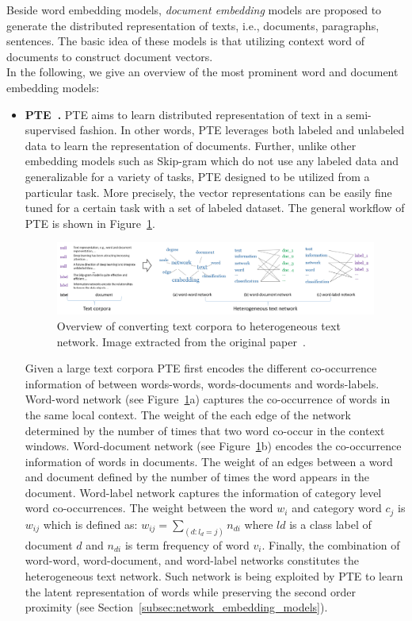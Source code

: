 Beside word embedding models, \textit{document embedding} models are proposed to generate the distributed representation of texts, i.e., documents, paragraphs, sentences. The basic idea of these models is that utilizing context word of documents to construct document vectors. \\
In the following, we give an overview of the most prominent word and document embedding models: \\
\begin{itemize}
\item \textbf{PTE~\cite{PTE}.} PTE aims to learn distributed representation of text in a semi-supervised fashion. In other words, PTE leverages both labeled and unlabeled data to learn the representation of documents. Further, unlike other embedding models such as Skip-gram which do not use any labeled data and generalizable for a variety of tasks, PTE designed to be utilized from a particular task.  More precisely, the vector representations can be easily fine tuned for a certain task with a set of labeled dataset. The general workflow of PTE is shown in Figure~\ref{fig:PTE}.
\begin{figure}[h]
 \includegraphics[width=\linewidth]{Figures/fig_PTE.png}
 \caption{Overview of converting text corpora to heterogeneous text network. Image extracted from the original paper~\cite{PTE}.}
 \label{fig:PTE}
\end{figure} 
Given a large text corpora PTE first encodes the different co-occurrence information of between words-words, words-documents and words-labels. 
Word-word network (see Figure~\ref{fig:PTE}a) captures the co-occurrence of words in the same local context. The weight of the each edge of the network determined by the number of times that two word co-occur in the context windows. Word-document network (see Figure~\ref{fig:PTE}b) encodes the co-occurrence information of words in documents. The weight of an edges between a word and document defined by the number of times the word appears in the document. Word-label network captures the information of category level word co-occurrences. The weight between the word $w_{i}$ and category word $c_{j}$ is $w_{ij}$ which is defined as: $w_{ij} = \sum_{(d:l_{d}=j)} {n_{di}}$ where $l{d}$ is a class label of document $d$ and $n_{di}$ is term frequency of word $v_{i}$. Finally, the combination of word-word, word-document, and word-label networks constitutes the heterogeneous text network. Such network is being exploited by PTE to learn the latent representation of words while preserving the second order proximity (see Section~\ref{subsec:network_embedding_models}).


\end{itemize}
